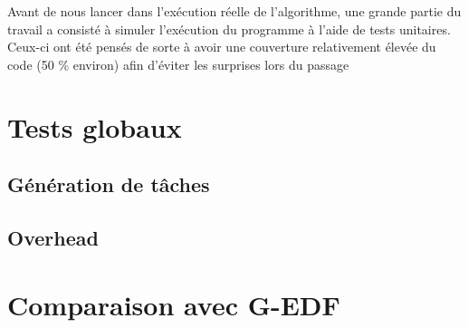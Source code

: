 	Avant de nous lancer dans l'exécution réelle de l'algorithme, une grande partie du travail a consisté 
	à simuler l'exécution du programme à l'aide de tests unitaires. Ceux-ci ont été pensés de sorte à avoir 
	une couverture relativement élevée du code (50 \% environ) afin d'éviter les surprises lors du passage 
	

\section{Tests globaux}

\subsection{Génération de tâches}

\subsection{Overhead}

\section{Comparaison avec G-EDF}
